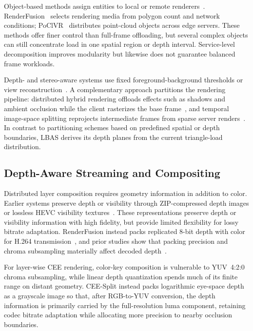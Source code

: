\documentclass[10pt,journal,compsoc]{IEEEtran}
\begin{document}
Object-based methods assign entities to local or remote renderers~\cite{lu_renderfusion_2023,wen_ar-light_2025,wu_edge-assisted_2024}. RenderFusion~\cite{lu_renderfusion_2023} selects rendering media from polygon count and network conditions; PoClVR~\cite{wu_edge-assisted_2024} distributes point-cloud objects across edge servers. These methods offer finer control than full-frame offloading, but several complex objects can still concentrate load in one spatial region or depth interval. Service-level decomposition improves modularity but likewise does not guarantee balanced frame workloads.

Depth- and stereo-aware systems use fixed foreground-background thresholds or view reconstruction~\cite{lai_furion_2020,meng_coterie_2020,ke_collabvr_2023,chen_you_2025}. A complementary approach partitions the rendering pipeline: distributed hybrid rendering offloads effects such as shadows and ambient occlusion while the client rasterizes the base frame~\cite{tan_dhr_2022,tan_dhrs_2024}, and temporal image-space splitting reprojects intermediate frames from sparse server renders~\cite{steiner_imagebased_2025}. In contrast to partitioning schemes based on predefined spatial or depth boundaries, LBAS derives its depth planes from the current triangle-load distribution.

\subsection{Depth-Aware Streaming and Compositing}

Distributed layer composition requires geometry information in addition to color. Earlier systems preserve depth or visibility through ZIP-compressed depth images or lossless HEVC visibility textures~\cite{chaudhuri_distributed_2008,stengel_lossless_2021}. These representations preserve depth or visibility information with high fidelity, but provide limited flexibility for lossy bitrate adaptation. RenderFusion instead packs replicated 8-bit depth with color for H.264 transmission~\cite{lu_renderfusion_2023}, and prior studies show that packing precision and chroma subsampling materially affect decoded depth~\cite{pece_depth_2011,siekkinen_depth_2023}.

For layer-wise CEE rendering, color-key composition is vulnerable to YUV~4:2:0 chroma subsampling, while linear depth quantization spends much of its finite range on distant geometry. CEE-Split instead packs logarithmic eye-space depth as a grayscale image so that, after RGB-to-YUV conversion, the depth information is primarily carried by the full-resolution luma component, retaining codec bitrate adaptation while allocating more precision to nearby occlusion boundaries.
\end{document}
